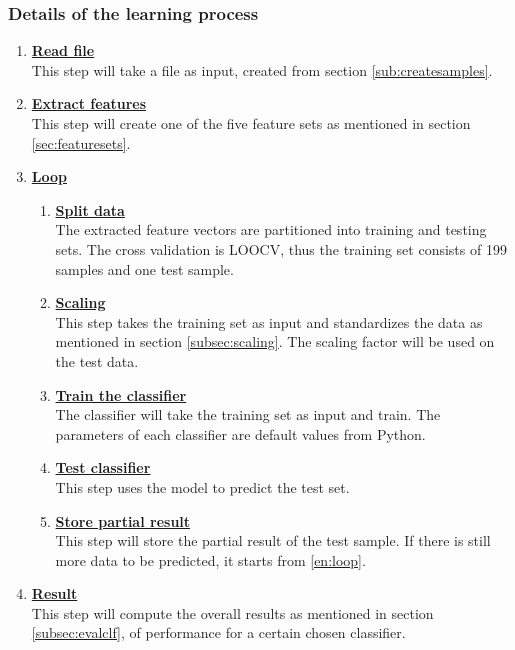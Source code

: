 \documentclass[USenglish]{ifimaster}  %
\begin{document}
\subsubsection{Details of the learning process} \label{sub:learningprocess}
\begin{enumerate}
\item \textbf{\underline{Read file}}
\\
This step will take a file as input, created from section \ref{sub:createsamples}.
		
\item \textbf{\underline{Extract features}}
\\
This step will create one of the five feature sets as mentioned in section \ref{sec:featuresets}.
		
\item \textbf{\underline{Loop}}
		
\begin{enumerate} 
\item \textbf{\underline{Split data}} \label{en:loop}
\\
The extracted feature vectors are partitioned into training and testing sets. The cross validation is LOOCV, thus the training set consists of 199 samples and one test sample.
			
\item \textbf{\underline{Scaling}}
\\
This step takes the training set as input and standardizes the data as mentioned in section \ref{subsec:scaling}. The scaling factor will be used on the test data.
			
\item \textbf{\underline{Train the classifier}}
\\
The classifier will take the training set as input and train. The parameters of each classifier are default values from Python. 
			
\item \textbf{\underline{Test classifier}} 
\\
This step uses the model to predict the test set.

\item \textbf{\underline{Store partial result}} 
\\
This step will store the partial result of the test sample. If there is still more data to be predicted, it starts from \ref{en:loop}.
\end{enumerate}	
		
\item \textbf{\underline{Result}}
\\
This step will compute the overall results as mentioned in section \ref{subsec:evalclf}, of performance for a certain chosen classifier. 
\end{enumerate}
	
\end{document}
